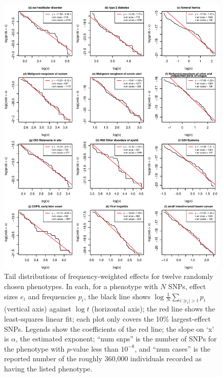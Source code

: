 \documentclass{article}
\newcommand{\1}{\mathbbm{1}}
\theoremstyle{remark}
\theoremstyle{definition}
\begin{document}
\begin{figure}
    \begin{center}
    \includegraphics{snp_effects/examples}
    \end{center}
    \caption{
        Tail distributions of frequency-weighted effects
        for twelve randomly chosen phenotypes.
        In each, for a phenotype with $N$ SNPs,
        effect sizes $e_i$ and frequencies $p_i$,
        the black line shows
        $\log \frac{1}{N} \sum_{i : |e_i| > t} p_i$ (vertical axis)
        against $\log t$ (horizontal axis);
        the red line shows the least-squares linear fit;
        each plot only covers the 10\% largest-effect SNPs.
        Legends show the coefficients of the red line; the slope on `x' is $\alpha$,
        the estimated exponent;
        ``num snps'' is the number of SNPs for the phenotype with $p$-value less than $10^{-8}$,
        and ``num cases'' is the reported number of the roughly 360,000 individuals
        recorded as having the listed phenotype.
        \label{fig:example_snps}
    }
\end{figure}
\end{document}
